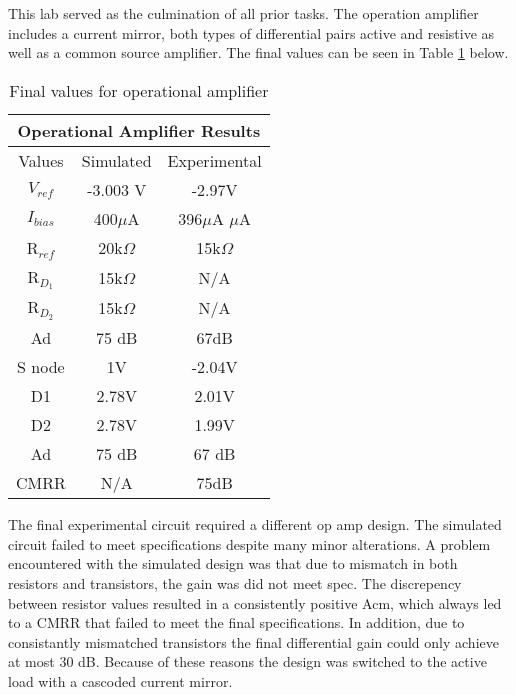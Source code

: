 

This lab served as the culmination of all prior tasks. The operation amplifier includes a current mirror, both types of differential pairs active and resistive as well as a common source amplifier. The final values can be seen in Table \ref{tab:FinalRes} below. 

\begin{table}[H]
\centering
\caption{Final values for operational amplifier}
\label{tab:FinalRes}
\begin{tabular}{|c|c|c|}
\hline
\multicolumn{3}{|c|}{Operational Amplifier Results} \\ \hline
Values          & Simulated          & Experimental          \\ \hline
$V_{ref}$               & -3.003 V                   & -2.97V                     \\ \hline
$I_{bias}$                & 400$\mu$A                   & 396$\mu$A $\mu$A                      \\ \hline
R$_{ref}$                 & 20k$\Omega$               & 15k$\Omega$                \\ \hline
R$_{D_1}$                 & 15k$\Omega$                   & N/A                  \\ \hline
R$_{D_2}$                 & 15k$\Omega$                   &  N/A                     \\ \hline
Ad                       & 75 dB             &  67dB  \\ \hline
S node                    & 1V                          & -2.04V \\ \hline
D1                          & 2.78V                     & 2.01V   \\ \hline
D2                         & 2.78V                      & 1.99V  \\ \hline
Ad                         & 75 dB                      & 67 dB \\ \hline
CMRR                   & N/A                          & 75dB \\ \hline
\end{tabular}
\end{table}
The final experimental circuit required a different op amp design. The simulated circuit failed to meet specifications despite many minor alterations. A problem encountered with the simulated design was that due to mismatch in both resistors and transistors, the gain was did not meet spec. The discrepency between resistor values resulted in a consistently positive Acm, which always led to a CMRR that failed to meet the final specifications. In addition, due to consistantly mismatched transistors the final differential gain could only achieve at most 30 dB. Because of these reasons the design was switched to the active load with a cascoded current mirror.

